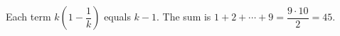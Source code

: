 Each term $k(1-\dfrac{1}{k})$ equals $k-1$. The sum is $1+2+\cdots+9=\dfrac{9\cdot10}{2}=\boxed{45}$.
